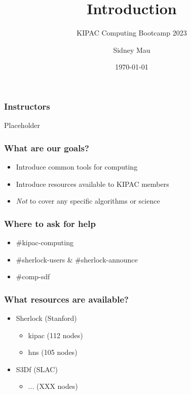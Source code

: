 \documentclass[aspectratio=169]{beamer}
\title{Introduction}
\subtitle{KIPAC Computing Bootcamp 2023}
\author[S. Mau]{Sidney Mau}
\institute[Stanford]{Stanford University}
\date[\today]{\today}
\begin{document}

\frame{\titlepage}



% 


\begin{frame}
	\frametitle{Instructors}
	Placeholder
\end{frame}

\begin{frame}
	\frametitle{What are our goals?}
	\begin{itemize}
		\item Introduce common tools for computing
		\item Introduce resources available to KIPAC members
		\item \emph{Not} to cover any specific algorithms or science
	\end{itemize}
\end{frame}

\begin{frame}
	\frametitle{Where to ask for help}
	\begin{itemize}
		\item \#kipac-computing
		\item \#sherlock-users \& \#sherlock-announce
		\item \#comp-sdf
	\end{itemize}
\end{frame}

\begin{frame}
	\frametitle{What resources are available?}
	\begin{itemize}
		\item Sherlock (Stanford)
			\begin{itemize}
				\item kipac (112 nodes)
				\item hns (105 nodes)
			\end{itemize}
		\item S3Df (SLAC)
			\begin{itemize}
				\item ... (XXX nodes)
			\end{itemize}
	\end{itemize}
\end{frame}
\end{document}
